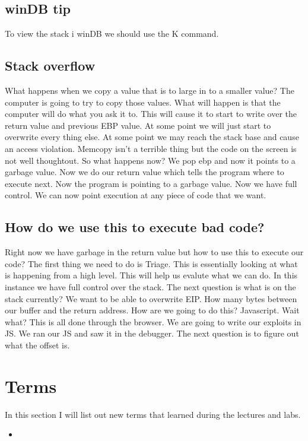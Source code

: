 \documentclass[letterpaper, onecolumn,10pt]{IEEEtran}
\begin{document}
		   
		   \subsection{winDB tip}
		   To view the stack i winDB we should use the K command.
		   
		   \subsection{Stack overflow}
		   What happens when we copy a value that is to large in to a smaller value? The computer is going to try to copy those values. What will happen is that the computer will do what you ask it to. This will cause it to start to write over the return value and previous EBP value. At some point we will just start to overwrite every thing else. At some point we may reach the stack base and cause an access violation. Memcopy isn't a terrible thing but the code on the screen is not well thoughtout. So what happens now? We pop ebp and now it points to a garbage value. Now we do our return value which tells the program where to execute next. Now the program is pointing to a garbage value. Now we have full control. We can now point execution at any piece of code that we want.\\
		   
		   \subsection{How do we use this to execute bad code?}
		   Right now we have garbage in the return value but how to use this to execute our code? The first thing we need to do is Triage. This is essentially looking at what is happening from a high level. This will help us evalute what we can do. In this instance we have full control over the stack. The next question is what is on the stack currently? We want to be able to overwrite EIP. How many bytes between our buffer and the return address. How are we going to do this? Javascript. Wait what? This is all done through the browser. We are going to write our exploits in JS. We ran our JS and saw it in the debugger. The next question is to figure out what the offset is.\\
		    
		
		
		\section{Terms}
		In this section I will list out new terms that learned during the lectures and labs.
		\begin{itemize}
		    \item 
		\end{itemize}
			
		
\end{document}
